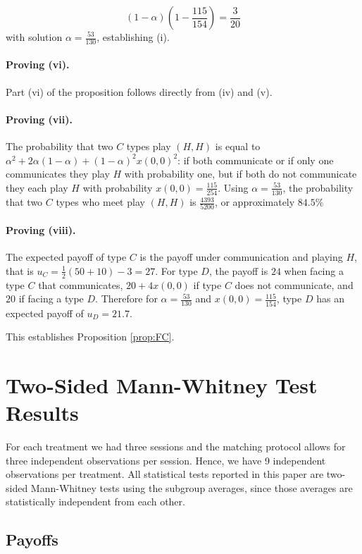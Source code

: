 \documentclass[12pt]{article}
\theoremstyle{break}
\begin{document}
%
\[
(1-\alpha)\left(1-\frac{115}{154}\right)=\frac{3}{20}
\]
%
with solution $\alpha=\frac{53}{130}$, establishing (i).

\paragraph{Proving (vi).} Part (vi) of the proposition follows directly from (iv) and (v).

\paragraph{Proving (vii).}	The probability that two $C$ types play $(H,H)$ is equal to $\alpha^2+2\alpha(1-\alpha)+(1-\alpha)^2 x(0,0)^2$: if both communicate or if only one communicates they play $H$ with probability one, but if both do not communicate they each play $H$ with probability $x(0,0)=\frac{115}{254}$. Using $\alpha=\frac{53}{130}$, the probability that two $C$ types who meet play $(H,H)$ is $\frac{4393}{5200}$, or approximately $84.5\%$

\paragraph{Proving (viii).} The expected payoff of type $C$ is the payoff under communication and playing $H$, that is $u_C=\frac{1}{2}(50+10)-3=27$. For type $D$, the payoff is $24$ when facing a type $C$ that communicates, $20+4x(0,0)$ if type $C$ does not communicate, and $20$ if facing a type $D$. Therefore for $\alpha=\frac{53}{130}$ and $x(0,0)=\frac{115}{154}$, type $D$ has an expected payoff of $u_D=21.7$.
%


This establishes Proposition \ref{prop:FC}.

\section{Two-Sided Mann-Whitney Test Results}

For each treatment we had three sessions and the matching protocol allows for three independent observations per session. Hence, we have 9 independent observations per treatment. All statistical tests reported in this paper are two-sided Mann-Whitney tests using the subgroup averages, since those averages are statistically independent from each other.

\subsection{Payoffs}
\end{document}
